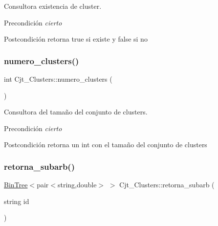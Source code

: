 Consultora existencia de cluster. 

\begin{DoxyPrecond}{Precondición}
{\itshape cierto} 
\end{DoxyPrecond}
\begin{DoxyPostcond}{Postcondición}
retorna true si existe y false si no 
\end{DoxyPostcond}
\mbox{\label{class_cjt___clusters_ad00d2fe80f0b0dc1e593a91f8be6b761}} 
\subsubsection{\texorpdfstring{numero\+\_\+clusters()}{numero\_clusters()}}
{\footnotesize\ttfamily int Cjt\+\_\+\+Clusters\+::numero\+\_\+clusters (\begin{DoxyParamCaption}{ }\end{DoxyParamCaption})}



Consultora del tamaño del conjunto de clusters. 

\begin{DoxyPrecond}{Precondición}
{\itshape cierto} 
\end{DoxyPrecond}
\begin{DoxyPostcond}{Postcondición}
retorna un int con el tamaño del conjunto de clusters 
\end{DoxyPostcond}
\mbox{\label{class_cjt___clusters_aca3506a7084d53e251ff052b0bbaf5bb}} 
\subsubsection{\texorpdfstring{retorna\+\_\+subarb()}{retorna\_subarb()}}
{\footnotesize\ttfamily \hyperlink{class_bin_tree}{Bin\+Tree}$<$pair$<$string,double$>$ $>$ Cjt\+\_\+\+Clusters\+::retorna\+\_\+subarb (\begin{DoxyParamCaption}\item[{string}]{id }\end{DoxyParamCaption})}



